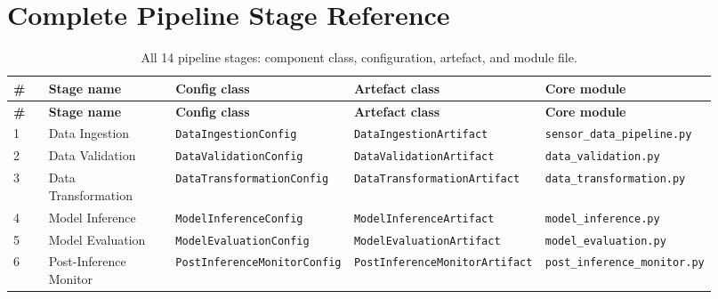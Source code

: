 \chapter{Complete Pipeline Stage Reference}
\label{app:pipeline_stages}

\begin{longtable}{p{0.05\linewidth}p{0.18\linewidth}p{0.24\linewidth}p{0.24\linewidth}p{0.21\linewidth}}
  \caption{All 14 pipeline stages: component class, configuration, artefact, and module file.}
  \label{tab:full_stages} \\
  \toprule
  \textbf{\#} & \textbf{Stage name}
    & \textbf{Config class}
    & \textbf{Artefact class}
    & \textbf{Core module} \\
  \midrule
  \endfirsthead
  \toprule
  \textbf{\#} & \textbf{Stage name}
    & \textbf{Config class}
    & \textbf{Artefact class}
    & \textbf{Core module} \\
  \midrule
  \endhead
  \bottomrule
  \endfoot

  1 & Data Ingestion
    & \texttt{DataIngestionConfig}
    & \texttt{DataIngestionArtifact}
    & \texttt{sensor\_data\_pipeline.py} \\[2pt]

  2 & Data Validation
    & \texttt{DataValidationConfig}
    & \texttt{DataValidationArtifact}
    & \texttt{data\_validation.py} \\[2pt]

  3 & Data Transformation
    & \texttt{DataTransformationConfig}
    & \texttt{DataTransformationArtifact}
    & \texttt{data\_transformation.py} \\[2pt]

  4 & Model Inference
    & \texttt{ModelInferenceConfig}
    & \texttt{ModelInferenceArtifact}
    & \texttt{model\_inference.py} \\[2pt]

  5 & Model Evaluation
    & \texttt{ModelEvaluationConfig}
    & \texttt{ModelEvaluationArtifact}
    & \texttt{model\_evaluation.py} \\[2pt]

  6 & Post-Inference Monitor
    & \texttt{PostInferenceMonitorConfig}
    & \texttt{PostInferenceMonitorArtifact}
    & \texttt{post\_inference\_monitor.py} \\[2pt]


\end{longtable}

